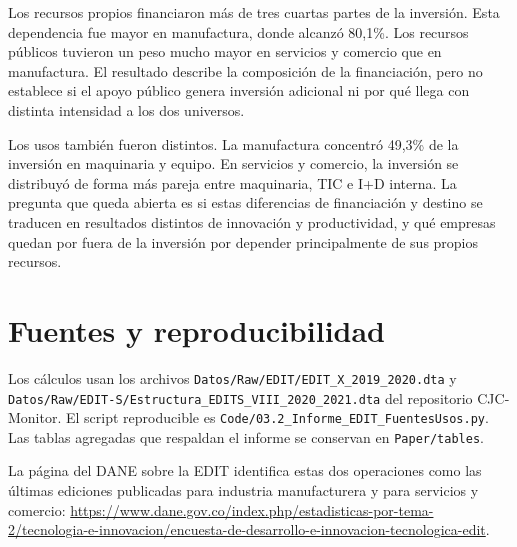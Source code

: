 Los recursos propios financiaron más de tres cuartas partes de la inversión. Esta dependencia fue mayor en manufactura, donde alcanzó 80,1\%. Los recursos públicos tuvieron un peso mucho mayor en servicios y comercio que en manufactura. El resultado describe la composición de la financiación, pero no establece si el apoyo público genera inversión adicional ni por qué llega con distinta intensidad a los dos universos.

Los usos también fueron distintos. La manufactura concentró 49,3\% de la inversión en maquinaria y equipo. En servicios y comercio, la inversión se distribuyó de forma más pareja entre maquinaria, TIC e I+D interna. La pregunta que queda abierta es si estas diferencias de financiación y destino se traducen en resultados distintos de innovación y productividad, y qué empresas quedan por fuera de la inversión por depender principalmente de sus propios recursos.

\section*{Fuentes y reproducibilidad}

Los cálculos usan los archivos \texttt{Datos/Raw/EDIT/EDIT\_X\_2019\_2020.dta} y \texttt{Datos/Raw/EDIT-S/Estructura\_EDITS\_VIII\_2020\_2021.dta} del repositorio CJC-Monitor. El script reproducible es \texttt{Code/03.2\_Informe\_EDIT\_FuentesUsos.py}. Las tablas agregadas que respaldan el informe se conservan en \texttt{Paper/tables}.

La página del DANE sobre la EDIT identifica estas dos operaciones como las últimas ediciones publicadas para industria manufacturera y para servicios y comercio: \url{https://www.dane.gov.co/index.php/estadisticas-por-tema-2/tecnologia-e-innovacion/encuesta-de-desarrollo-e-innovacion-tecnologica-edit}.
